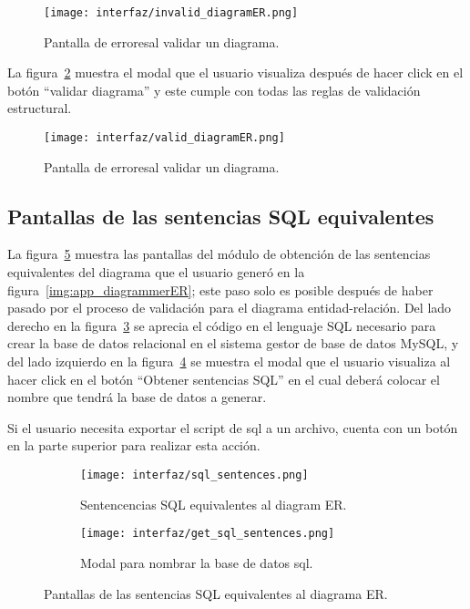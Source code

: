 \begin{figure}[H]
    \centering
    \texttt{[image: interfaz/invalid\_diagramER.png]}
    \caption{Pantalla de erroresal validar un diagrama.}
    \label{img:app_errorDiagram}
\end{figure}

La figura~\ref{img:app_validDiagram} muestra el modal que el usuario visualiza después de hacer click en el botón ``validar diagrama'' y este cumple con todas las reglas de validación estructural.

\begin{figure}[H]
    \centering
    \texttt{[image: interfaz/valid\_diagramER.png]}
    \caption{Pantalla de erroresal validar un diagrama.}
    \label{img:app_validDiagram}
\end{figure}

\subsection*{Pantallas de las sentencias SQL equivalentes}

La figura~\ref{img:app_sqlSentences} muestra las pantallas del módulo de obtención de las sentencias equivalentes del diagrama que el usuario generó en la figura~\ref{img:app_diagrammerER}; este paso solo es posible después de haber pasado por el proceso de validación para el diagrama entidad-relación.
Del lado derecho en la figura~\ref{img:app_sqlScript} se aprecia el código en el lenguaje SQL necesario para crear la base de datos relacional en el sistema gestor de base de datos MySQL, y del lado izquierdo en la figura~\ref{img:app_dbName} se muestra el modal que el usuario visualiza al hacer click en el botón ``Obtener sentencias SQL'' en el cual deberá colocar el nombre que tendrá la base de datos a generar.

Si el usuario necesita exportar el script de sql a un archivo, cuenta con un botón en la parte superior para realizar esta acción.

\begin{figure}[H]
    \begin{subfigure}[b]{0.49\textwidth}
        \texttt{[image: interfaz/sql\_sentences.png]}
        \caption{Sentencencias SQL equivalentes al diagram ER.}
        \label{img:app_sqlScript}
      \end{subfigure}
      \hfill
      \begin{subfigure}[b]{0.49\textwidth}
        \texttt{[image: interfaz/get\_sql\_sentences.png]}
        \caption{Modal para nombrar la base de datos sql.}
        \label{img:app_dbName}
      \end{subfigure}
    \caption{Pantallas de las sentencias SQL equivalentes al diagrama ER.}
    \label{img:app_sqlSentences}
\end{figure}

